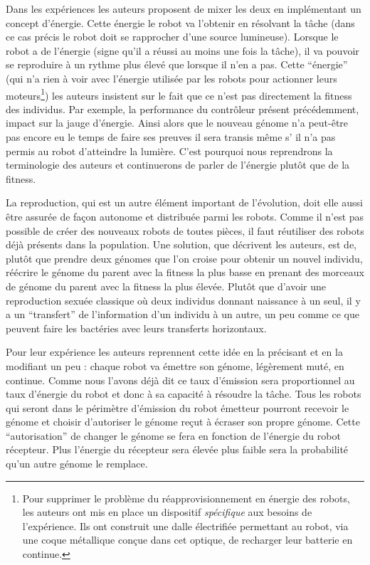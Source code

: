 Dans les expériences les auteurs proposent de mixer les deux en implémentant un concept d'énergie. Cette énergie le robot va l'obtenir en résolvant la tâche (dans ce cas précis le robot doit se rapprocher d'une source lumineuse). Lorsque le robot a de l'énergie (signe qu'il a réussi au moins une fois la tâche), il va pouvoir se reproduire à un rythme plus élevé que lorsque il n'en a pas. Cette ``énergie'' (qui n'a rien à voir avec l'énergie utilisée par les robots pour actionner leurs moteurs\footnote{Pour supprimer le problème du réapprovisionnement en énergie des robots, les auteurs ont mis en place un dispositif \emph{spécifique} aux besoins de l'expérience. Ils ont construit une dalle électrifiée permettant au robot, via une coque métallique conçue dans cet optique, de recharger leur batterie en continue.}) les auteurs insistent sur le fait que ce n'est pas directement la fitness des individus. Par exemple, la performance du contrôleur présent précédemment, impact sur la jauge d'énergie. Ainsi alors que le nouveau génome n'a peut-être pas encore eu le temps de faire ses preuves il sera transis même s' il n'a pas permis au robot d'atteindre la lumière. C'est pourquoi nous reprendrons la terminologie des auteurs et continuerons de parler de l'énergie plutôt que de la fitness.

La reproduction, qui est un autre élément important de l'évolution, doit elle aussi être assurée de façon autonome et distribuée parmi les robots. Comme il n'est pas possible de créer des nouveaux robots de toutes pièces, il faut réutiliser des robots déjà présents dans la population. Une solution, que décrivent les auteurs, est de, plutôt que prendre deux génomes que l'on croise pour obtenir un nouvel individu, réécrire le génome du parent avec la fitness la plus basse en prenant des morceaux de génome du parent avec la fitness la plus élevée. Plutôt que d'avoir une reproduction sexuée classique où deux individus donnant naissance à un seul, il y a un ``transfert'' de l'information d'un individu à un autre, un peu comme ce que peuvent faire les bactéries avec leurs transferts horizontaux.

Pour leur expérience les auteurs reprennent cette idée en la précisant et en la modifiant un peu : chaque robot va émettre son génome, légèrement muté, en continue. Comme nous l'avons déjà dit ce taux d'émission sera proportionnel au taux d'énergie du robot et donc à sa capacité à résoudre la tâche. Tous les robots qui seront dans le périmètre d'émission du robot émetteur pourront recevoir le génome et choisir d'autoriser le génome reçut à écraser son propre génome. Cette ``autorisation'' de changer le génome se fera en fonction de l'énergie du robot récepteur. Plus l'énergie du récepteur sera élevée plus faible sera la probabilité qu'un autre génome le remplace.

